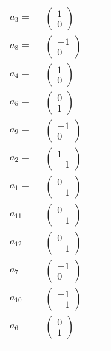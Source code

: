\documentclass[1p]{elsarticle_modified}
\theoremstyle{definition}
\begin{document}
\begin{tabular}{m{7pt} m{180pt} m{7pt} m{180pt} }
\flushright $a_{3}=$&$\begin{pmatrix}1\\0\end{pmatrix}$ \\
\flushright $a_{8}=$&$\begin{pmatrix}-1\\0\end{pmatrix}$ \\
\flushright $a_{4}=$&$\begin{pmatrix}1\\0\end{pmatrix}$ \\
\flushright $a_{5}=$&$\begin{pmatrix}0\\1\end{pmatrix}$ \\
\flushright $a_{9}=$&$\begin{pmatrix}-1\\0\end{pmatrix}$ \\
\flushright $a_{2}=$&$\begin{pmatrix}1\\-1\end{pmatrix}$ \\
\flushright $a_{1}=$&$\begin{pmatrix}0\\-1\end{pmatrix}$ \\
\flushright $a_{11}=$&$\begin{pmatrix}0\\-1\end{pmatrix}$ \\
\flushright $a_{12}=$&$\begin{pmatrix}0\\-1\end{pmatrix}$ \\
\flushright $a_{7}=$&$\begin{pmatrix}-1\\0\end{pmatrix}$ \\
\flushright $a_{10}=$&$\begin{pmatrix}-1\\-1\end{pmatrix}$ \\
\flushright $a_{6}=$&$\begin{pmatrix}0\\1\end{pmatrix}$\\&\end{tabular}
\end{document}

